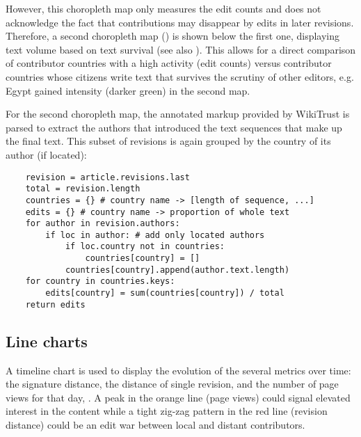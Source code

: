
However, this choropleth map only measures the edit counts and does not acknowledge the fact that contributions may disappear by edits in later revisions. 
Therefore, a second choropleth map () is shown below the first one, displaying text volume  based on text survival (see also ).
This allows for a direct comparison of contributor countries with a high activity (edit counts) versus contributor countries whose citizens write text that survives the scrutiny of other editors, e.g. Egypt gained intensity (darker green) in the second map.


For the second choropleth map, the annotated markup provided by WikiTrust is parsed to extract the authors that introduced the text sequences that make up the final text.
This subset of revisions is again grouped by the country of its author (if located):

\begin{lstlisting}
	revision = article.revisions.last
	total = revision.length
	countries = {} # country name -> [length of sequence, ...]
	edits = {} # country name -> proportion of whole text
	for author in revision.authors:
		if loc in author: # add only located authors
			if loc.country not in countries:
				countries[country] = []
			countries[country].append(author.text.length)
	for country in countries.keys:
		edits[country] = sum(countries[country]) / total
	return edits
\end{lstlisting}

\subsection{Line charts}

A timeline chart is used to display the evolution of the several metrics over time: the signature distance, the distance of single revision, and the number of page views for that day, .
A peak in the orange line (page views) could signal elevated interest in the content while a tight zig-zag pattern in the red line (revision distance) could be an edit war between local and distant contributors.

